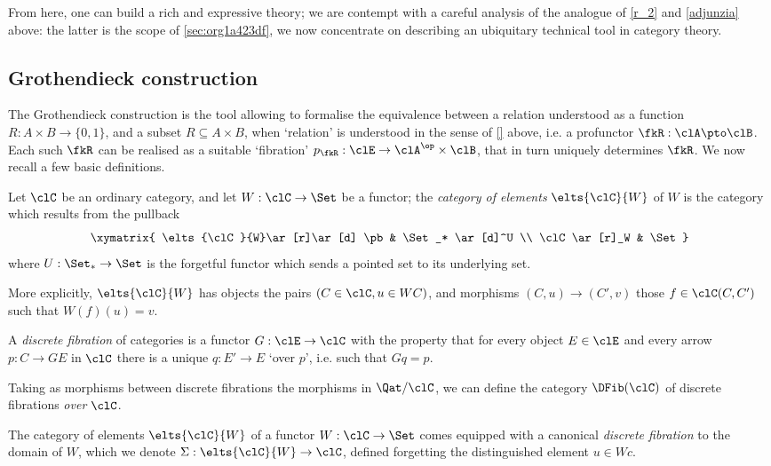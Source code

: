 \documentclass[a4paper]{../birkjour}
\begin{document}
From here, one can build a rich and expressive theory; we are contempt with a careful analysis of the analogue of \ref{r_2} and \eqref{adjunzia} above: the latter is the scope of \autoref{sec:org1a423df}, we now concentrate on describing an ubiquitary technical tool in category theory.
\subsection{Grothendieck construction}
The Grothendieck construction is the tool allowing to formalise the equivalence between a relation understood as a function $R : A\times B \to \{0,1\}$, and a subset $R\subseteq A\times B$, when `relation' is understood in the sense of \autoref{} above, i.e. a profunctor $\fkR : \clA \pto \clB$. Each such $\fkR$ can be realised as a suitable `fibration' $p_\fkR : \clE \to \clA^\op\times\clB$, that in turn uniquely determines $\fkR$.
We now recall a few basic definitions.
\begin{definition}\label{eltsf}
	Let $\clC$ be an ordinary category, and let $W : \clC\to \Set$ be a functor; the \emph{category of elements} $\elts{\clC}{W}$ of $W$ is the category which results from the pullback
  \[
    \xymatrix{
      \elts{\clC}{W}\ar[r]\ar[d] \pb & \Set_* \ar[d]^U \\
      \clC \ar[r]_W & \Set
    }
  \]
  where $U : \Set_*\to\Set$ is the forgetful functor which sends a pointed set to its underlying set.
  
  More explicitly, $\elts{\clC}{W}$ has objects the pairs $(C\in\clC, u\in WC)$, and morphisms $(C,u)\to (C',v)$ those $f\in \clC(C,C')$ such that $W(f)(u)=v$.
\end{definition}
\begin{definition}
	\label{def:dfib}
	A \emph{discrete fibration} of categories is a functor $G : \clE \to \clC$ with the property that for every object $E\in\clE$ and every arrow $p : C\to GE$ in $\clC$ there is a unique $q : E'\to E$ `over $p$', i.e. such that $Gq=p$.
\end{definition}
Taking as morphisms between discrete fibrations the morphisms in $\Qat/\clC$, we can define the category $\DFib(\clC)$ of discrete fibrations \emph{over} $\clC$.
\begin{proposition}\label{fibelem}
	The category of elements $\elts{\clC}{W}$ of a functor $W : \clC\to \Set$ comes equipped with a canonical \emph{discrete fibration} to the domain of $W$, which we denote $\Sigma : \elts{\clC}{W}\to \clC$, defined forgetting the distinguished element $u\in Wc$.
\end{proposition}
\end{document}
